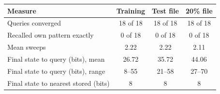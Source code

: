 \begin{tabular}{@{}lccc@{}}
\toprule
Measure & Training & Test file & 20\% file \\
\midrule
Queries converged & 18 of 18 & 18 of 18 & 18 of 18 \\
Recalled own pattern exactly & 0 of 18 & 0 of 18 & 0 of 18 \\
Mean sweeps & 2.22 & 2.22 & 2.11 \\
Final state to query (bits), mean & 26.72 & 35.72 & 44.06 \\
Final state to query (bits), range & 8--55 & 21--58 & 27--70 \\
Final state to nearest stored (bits) & 8 & 8 & 8 \\
\bottomrule
\end{tabular}
